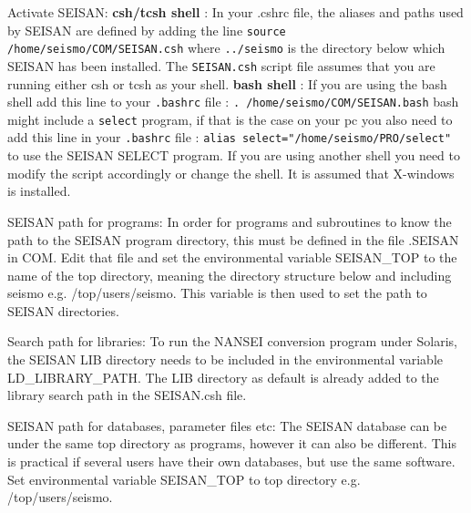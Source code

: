 Activate SEISAN:\newline
\textbf{csh/tcsh shell} :\newline
In your .cshrc file, the aliases and paths used by SEISAN are defined 
by adding the line \newline
\texttt{source /home/seismo/COM/SEISAN.csh} \newline
where 
\texttt{../seismo} is the directory below which SEISAN has been installed. 
The \texttt{SEISAN.csh} script file assumes that you are running either csh or 
tcsh as your shell. \newline
\textbf{bash shell} :\newline
If you are using the  bash shell add this line to your 
\texttt{.bashrc} file :\newline
\texttt{. /home/seismo/COM/SEISAN.bash} \newline
bash might include a 
\texttt{select} program, if that is the case on your pc you also need to add this 
line in your 
\texttt{.bashrc} file :\newline
\texttt{alias select="/home/seismo/PRO/select"} \newline
to use the SEISAN SELECT program.
 \newline
If you are using another shell you need to modify the script 
accordingly or change the shell. It is assumed that 
X-windows is installed. 

SEISAN path for programs:\newline
In order for programs and subroutines to know the path to the SEISAN program directory, this must be defined in the file .SEISAN in COM. Edit that file and set the environmental variable SEISAN\_TOP to the name of the top directory, meaning the directory structure below and including seismo e.g. /top/users/seismo. This variable is then used to set the path to SEISAN directories. 

Search path for libraries:\newline
To run the NANSEI conversion program under Solaris, the SEISAN LIB directory needs to be included in the environmental variable LD\_LIBRARY\_PATH. The LIB directory as default is already added to the library search path in the SEISAN.csh file. 

SEISAN path for databases, parameter files etc:\newline
The SEISAN database can be under the same top directory as programs, however it can also be different. This is practical if several users have their own databases, but use the same software. Set environmental variable SEISAN\_TOP to top directory e.g. /top/users/seismo. 

